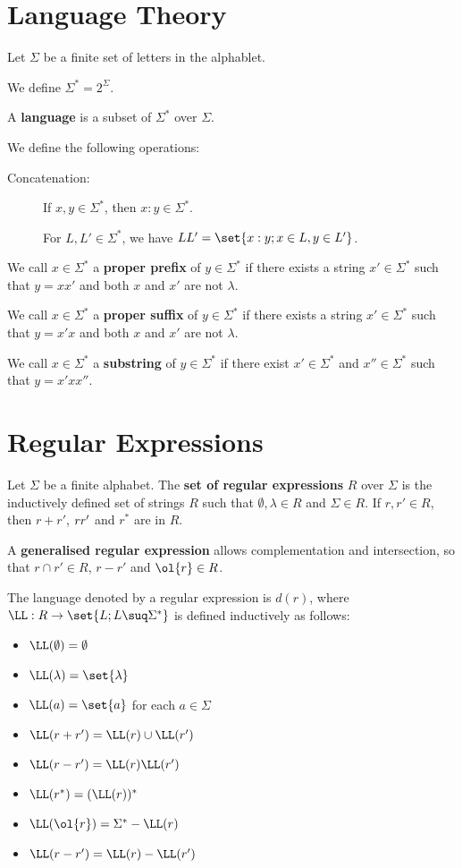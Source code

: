 \documentclass[11pt]{scrartcl}
\begin{document}
\section{Language Theory}

Let $\Sigma$ be a finite set of letters in the alphablet.

We define $\Sigma^{*} = 2^{\Sigma}$.

A \textbf{language} is a subset of $\Sigma^{*}$ over $\Sigma$.

We define the following operations:

\begin{description}

\item[Concatenation:] 
\hfill

If $x,y \in \Sigma^{*}$, then $x:y \in \Sigma^{*}$. 

For $L, L'\in \Sigma^{*}$, we have $L\*L' = \set{x:y; x\in L, y\in L'}$.
\end{description}

We call $x\in\Sigma^{*}$ a \textbf{proper prefix} of $y\in\Sigma^{*}$ if there
exists a string $x'\in\Sigma^{*}$ such that $y = xx'$ and both $x$ and
$x'$ are not $\lambda$.

We call $x\in\Sigma^{*}$ a \textbf{proper suffix} of $y\in\Sigma^{*}$ if there
exists a string $x'\in\Sigma^{*}$ such that $y = x'x$ and both $x$ and
$x'$ are not $\lambda$.

We call $x\in\Sigma^{*}$ a \textbf{substring} of $y\in\Sigma^{*}$ if there
exist $x'\in \Sigma^{*}$ and $x''\in\Sigma^{*}$ such that
$y = x' x x''$.

\section{Regular Expressions}

Let $\Sigma$ be a finite alphabet. The \textbf{set of regular
  expressions} $R$ over $\Sigma$ is the inductively defined set of
strings $R$ such that $\emptyset, \lambda \in R$ and $\Sigma \in R$. If
$r, r' \in R$, then $r+r'$, $r\* r'$ and $r^{*}$ are in $R$.

A \textbf{generalised regular expression} allows complementation and
intersection, so that $r\cap r' \in R$, $r-r'$ and $\ol{r} \in R$.

The language denoted by a regular expression is $d(r)$, where
$\LL: R \to \set{L; L\suq \Sigma^{*}}$ is defined inductively as follows:
\begin{itemize}
\item $\LL(\emptyset) = \emptyset$
\item $\LL(\lambda)   = \set{\lambda}$
\item $\LL(a)         = \set{a}$ for each $a\in\Sigma$
\item $\LL(r+r')      = \LL(r)\cup \LL(r')$
\item $\LL(r-r')      = \LL(r)\*\LL(r')$
\item $\LL(r^{*})     = (\LL(r))^{*}$
\item $\LL(\ol{r}) = \Sigma^{*} - \LL(r)$
\item $\LL(r-r') = \LL(r)-\LL(r')$
\end{itemize} 
\end{document}
